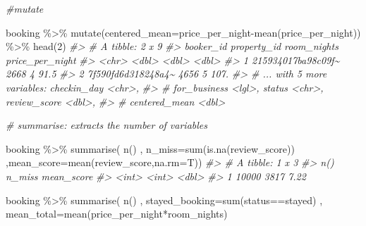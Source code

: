 \documentclass[
]{article}
\newenvironment{Shaded}{\begin{snugshade}}{\end{snugshade}}
\newcommand{\AttributeTok}[1]{\textcolor[rgb]{0.77,0.63,0.00}{#1}}
\newcommand{\CommentTok}[1]{\textcolor[rgb]{0.56,0.35,0.01}{\textit{#1}}}
\newcommand{\DecValTok}[1]{\textcolor[rgb]{0.00,0.00,0.81}{#1}}
\newcommand{\FunctionTok}[1]{\textcolor[rgb]{0.00,0.00,0.00}{#1}}
\newcommand{\NormalTok}[1]{#1}
\newcommand{\SpecialCharTok}[1]{\textcolor[rgb]{0.00,0.00,0.00}{#1}}
\newcommand{\StringTok}[1]{\textcolor[rgb]{0.31,0.60,0.02}{#1}}
\begin{document}
\begin{Shaded}
\begin{Highlighting}[]

\CommentTok{\#mutate}

\NormalTok{booking }\SpecialCharTok{\%\textgreater{}\%} 
  \FunctionTok{mutate}\NormalTok{(}\AttributeTok{centered\_mean=}\NormalTok{price\_per\_night}\SpecialCharTok{{-}}\FunctionTok{mean}\NormalTok{(price\_per\_night)) }\SpecialCharTok{\%\textgreater{}\%} 
  \FunctionTok{head}\NormalTok{(}\DecValTok{2}\NormalTok{)}
\CommentTok{\#\textgreater{} \# A tibble: 2 x 9}
\CommentTok{\#\textgreater{}   booker\_id          property\_id room\_nights price\_per\_night}
\CommentTok{\#\textgreater{}   \textless{}chr\textgreater{}                    \textless{}dbl\textgreater{}       \textless{}dbl\textgreater{}           \textless{}dbl\textgreater{}}
\CommentTok{\#\textgreater{} 1 215934017ba98c09f\textasciitilde{}        2668           4            91.5}
\CommentTok{\#\textgreater{} 2 7f590fd6d318248a4\textasciitilde{}        4656           5           107. }
\CommentTok{\#\textgreater{} \# ... with 5 more variables: checkin\_day \textless{}chr\textgreater{},}
\CommentTok{\#\textgreater{} \#   for\_business \textless{}lgl\textgreater{}, status \textless{}chr\textgreater{}, review\_score \textless{}dbl\textgreater{},}
\CommentTok{\#\textgreater{} \#   centered\_mean \textless{}dbl\textgreater{}}

\CommentTok{\# summarise: extracts the number of variables}

\NormalTok{booking }\SpecialCharTok{\%\textgreater{}\%} 
  \FunctionTok{summarise}\NormalTok{(}
    \FunctionTok{n}\NormalTok{()}
\NormalTok{    , }\AttributeTok{n\_miss=}\FunctionTok{sum}\NormalTok{(}\FunctionTok{is.na}\NormalTok{(review\_score))}
\NormalTok{    ,}\AttributeTok{mean\_score=}\FunctionTok{mean}\NormalTok{(review\_score,}\AttributeTok{na.rm=}\NormalTok{T))}
\CommentTok{\#\textgreater{} \# A tibble: 1 x 3}
\CommentTok{\#\textgreater{}   \textasciigrave{}n()\textasciigrave{} n\_miss mean\_score}
\CommentTok{\#\textgreater{}   \textless{}int\textgreater{}  \textless{}int\textgreater{}      \textless{}dbl\textgreater{}}
\CommentTok{\#\textgreater{} 1 10000   3817       7.22}

\NormalTok{booking }\SpecialCharTok{\%\textgreater{}\%} 
  \FunctionTok{summarise}\NormalTok{(}
     \FunctionTok{n}\NormalTok{()}
\NormalTok{    , }\AttributeTok{stayed\_booking=}\FunctionTok{sum}\NormalTok{(status}\SpecialCharTok{==}\StringTok{\textquotesingle{}stayed\textquotesingle{}}\NormalTok{)}
\NormalTok{    , }\AttributeTok{mean\_total=}\FunctionTok{mean}\NormalTok{(price\_per\_night}\SpecialCharTok{*}\NormalTok{room\_nights)                   }
                         

\end{Highlighting}
\end{Shaded}
\end{document}
